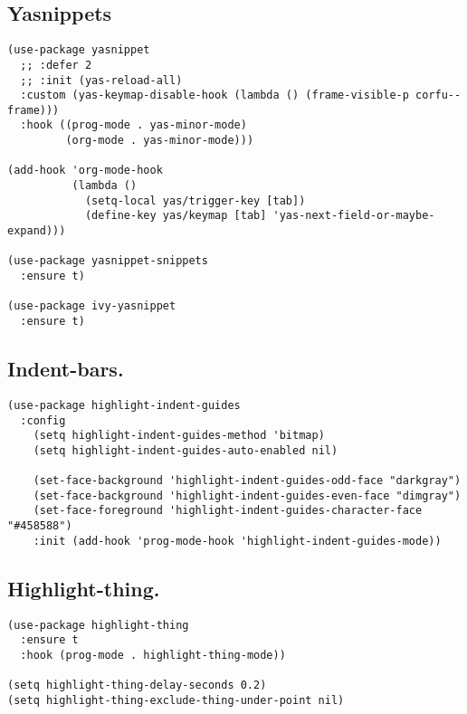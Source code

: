 \documentclass[11pt]{article}
\begin{document}
\subsection{Yasnippets}
\label{sec:orgda0cb1e}
\begin{verbatim}
(use-package yasnippet
  ;; :defer 2
  ;; :init (yas-reload-all)
  :custom (yas-keymap-disable-hook (lambda () (frame-visible-p corfu--frame)))
  :hook ((prog-mode . yas-minor-mode)
         (org-mode . yas-minor-mode)))

(add-hook 'org-mode-hook
          (lambda ()
            (setq-local yas/trigger-key [tab])
            (define-key yas/keymap [tab] 'yas-next-field-or-maybe-expand)))

(use-package yasnippet-snippets
  :ensure t)

(use-package ivy-yasnippet
  :ensure t)
\end{verbatim}
\subsection{Indent-bars.}
\label{sec:org8fd2c02}
\begin{verbatim}
(use-package highlight-indent-guides
  :config
    (setq highlight-indent-guides-method 'bitmap)
    (setq highlight-indent-guides-auto-enabled nil)

    (set-face-background 'highlight-indent-guides-odd-face "darkgray")
    (set-face-background 'highlight-indent-guides-even-face "dimgray")
    (set-face-foreground 'highlight-indent-guides-character-face "#458588")
    :init (add-hook 'prog-mode-hook 'highlight-indent-guides-mode))
\end{verbatim}
\subsection{Highlight-thing.}
\label{sec:org91f7e56}
\begin{verbatim}
(use-package highlight-thing
  :ensure t
  :hook (prog-mode . highlight-thing-mode))

(setq highlight-thing-delay-seconds 0.2)
(setq highlight-thing-exclude-thing-under-point nil)
\end{verbatim}
\end{document}
